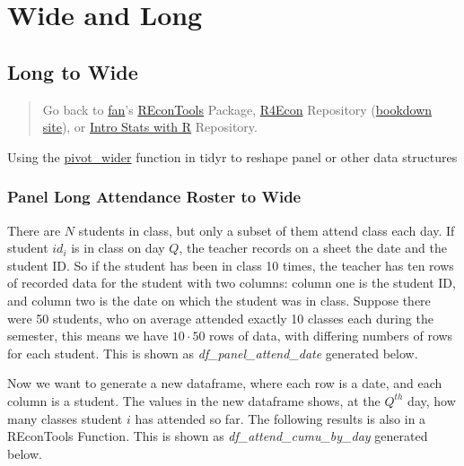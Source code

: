 \documentclass[
]{book}
\begin{document}
\hypertarget{wide-and-long}{%
\section{Wide and Long}\label{wide-and-long}}

\hypertarget{long-to-wide}{%
\subsection{Long to Wide}\label{long-to-wide}}

\begin{quote}
Go back to \href{http://fanwangecon.github.io/}{fan}'s \href{https://fanwangecon.github.io/REconTools/}{REconTools} Package, \href{https://fanwangecon.github.io/R4Econ/}{R4Econ} Repository (\href{https://fanwangecon.github.io/R4Econ/bookdown}{bookdown site}), or \href{https://fanwangecon.github.io/Stat4Econ/}{Intro Stats with R} Repository.
\end{quote}

Using the \href{https://tidyr.tidyverse.org/reference/pivot_wider.html}{pivot\_wider} function in tidyr to reshape panel or other data structures

\hypertarget{panel-long-attendance-roster-to-wide}{%
\subsubsection{Panel Long Attendance Roster to Wide}\label{panel-long-attendance-roster-to-wide}}

There are \(N\) students in class, but only a subset of them attend class each day. If student \(id_i\) is in class on day \(Q\), the teacher records on a sheet the date and the student ID. So if the student has been in class 10 times, the teacher has ten rows of recorded data for the student with two columns: column one is the student ID, and column two is the date on which the student was in class. Suppose there were 50 students, who on average attended exactly 10 classes each during the semester, this means we have \(10 \cdot 50\) rows of data, with differing numbers of rows for each student. This is shown as \emph{df\_panel\_attend\_date} generated below.

Now we want to generate a new dataframe, where each row is a date, and each column is a student. The values in the new dataframe shows, at the \(Q^{th}\) day, how many classes student \(i\) has attended so far. The following results is also in a REconTools Function. This is shown as \emph{df\_attend\_cumu\_by\_day} generated below.
\end{document}
